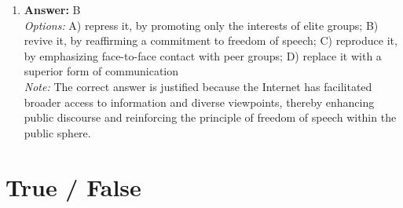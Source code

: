 \documentclass[12pt]{article}
\begin{document}
\begin{enumerate}[label=\arabic*.]
\item \textbf{Answer:} B
\\ \textit{Options:} A) repress it, by promoting only the interests of elite groups; B) revive it, by reaffirming a commitment to freedom of speech; C) reproduce it, by emphasizing face-to-face contact with peer groups; D) replace it with a superior form of communication
\\ \textit{Note:} The correct answer is justified because the Internet has facilitated broader access to information and diverse viewpoints, thereby enhancing public discourse and reinforcing the principle of freedom of speech within the public sphere.
\end{enumerate}

\section*{True / False}
\end{document}
